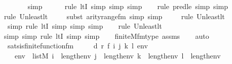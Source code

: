 \begin{isabellebody}
\ \ \ \ \ \isamarkupfalse%
\ simp\isanewline
\ \ \ \ \ \isamarkupfalse%
{\isacharparenleft}{\kern0pt}rule\ ltI{\isacharcomma}{\kern0pt}\ simp{\isacharcomma}{\kern0pt}\ simp{\isacharcomma}{\kern0pt}\ simp{\isacharparenright}{\kern0pt}\isanewline
\ \ \ \isamarkupfalse%
{\isacharparenleft}{\kern0pt}rule\ pred{\isacharunderscore}{\kern0pt}le{\isacharcomma}{\kern0pt}\ simp{\isacharcomma}{\kern0pt}\ simp{\isacharparenright}{\kern0pt}{\isacharplus}{\kern0pt}\isanewline
\ \ \ \isamarkupfalse%
{\isacharparenleft}{\kern0pt}rule\ Un{\isacharunderscore}{\kern0pt}least{\isacharunderscore}{\kern0pt}lt{\isacharparenright}{\kern0pt}{\isacharplus}{\kern0pt}\isanewline
\ \ \ \ \isamarkupfalse%
{\isacharparenleft}{\kern0pt}subst\ arity{\isacharunderscore}{\kern0pt}range{\isacharunderscore}{\kern0pt}fm{\isacharcomma}{\kern0pt}\ simp{\isacharcomma}{\kern0pt}\ simp{\isacharparenright}{\kern0pt}\isanewline
\ \ \ \ \isamarkupfalse%
{\isacharparenleft}{\kern0pt}rule\ Un{\isacharunderscore}{\kern0pt}least{\isacharunderscore}{\kern0pt}lt{\isacharparenright}{\kern0pt}{\isacharplus}{\kern0pt}\isanewline
\ \ \ \ \ \isamarkupfalse%
\ {\isacharparenleft}{\kern0pt}simp{\isacharcomma}{\kern0pt}\ rule\ ltI{\isacharcomma}{\kern0pt}\ simp{\isacharcomma}{\kern0pt}\ simp{\isacharcomma}{\kern0pt}\ simp{\isacharparenright}{\kern0pt}\isanewline
\ \ \ \isamarkupfalse%
{\isacharparenleft}{\kern0pt}rule\ Un{\isacharunderscore}{\kern0pt}least{\isacharunderscore}{\kern0pt}lt{\isacharparenright}{\kern0pt}{\isacharplus}{\kern0pt}\isanewline
\ \ \ \ \isamarkupfalse%
{\isacharparenleft}{\kern0pt}simp{\isacharcomma}{\kern0pt}\ simp{\isacharcomma}{\kern0pt}\ rule\ ltI{\isacharcomma}{\kern0pt}\ simp{\isacharcomma}{\kern0pt}\ simp{\isacharparenright}{\kern0pt}\isanewline
\ \ \isamarkupfalse%
\ finite{\isacharunderscore}{\kern0pt}M{\isacharunderscore}{\kern0pt}fm{\isacharunderscore}{\kern0pt}type\ assms\isanewline
\ \ \isamarkupfalse%
\ auto%
\endisatagproof
{\isafoldproof}%
%
\isadelimproof
\isanewline
%
\endisadelimproof
\isanewline
{}\isamarkupfalse%
\ sats{\isacharunderscore}{\kern0pt}is{\isacharunderscore}{\kern0pt}finite{\isacharunderscore}{\kern0pt}function{\isacharunderscore}{\kern0pt}fm\ {\isacharcolon}{\kern0pt}\ \isanewline
\ \ \ d\ r\ f\ i\ j\ k\ l\ env\ \isanewline
\ \ \ {\isachardoublequoteopen}env\ {\isasymin}\ list{\isacharparenleft}{\kern0pt}M{\isacharparenright}{\kern0pt}{\isachardoublequoteclose}\ {\isachardoublequoteopen}i\ {\isacharless}{\kern0pt}\ length{\isacharparenleft}{\kern0pt}env{\isacharparenright}{\kern0pt}{\isachardoublequoteclose}\ {\isachardoublequoteopen}j\ {\isacharless}{\kern0pt}\ length{\isacharparenleft}{\kern0pt}env{\isacharparenright}{\kern0pt}{\isachardoublequoteclose}\ {\isachardoublequoteopen}k\ {\isacharless}{\kern0pt}\ length{\isacharparenleft}{\kern0pt}env{\isacharparenright}{\kern0pt}{\isachardoublequoteclose}\ {\isachardoublequoteopen}l\ {\isacharless}{\kern0pt}\ length{\isacharparenleft}{\kern0pt}env{\isacharparenright}{\kern0pt}{\isachardoublequoteclose}\ \isanewline

\end{isabellebody}
